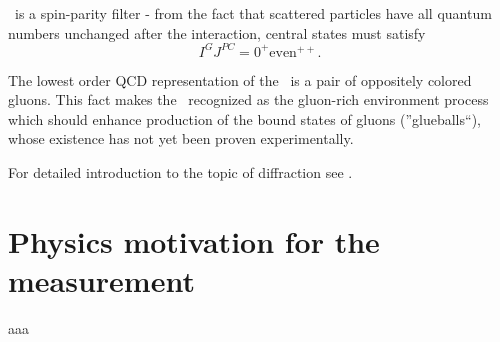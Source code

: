 \DPE\ is a spin-parity filter - from the fact that scattered particles have all quantum numbers unchanged after the interaction, central states must satisfy
\begin{equation}\label{eq:DPE_IGJPC}
 I^{G}J^{PC}=0^{+}\textrm{even}^{++}.
\end{equation}

The lowest order QCD representation of the \Pomeron\ is a pair of oppositely colored gluons. This fact makes the \DPE\ recognized as the gluon-rich environment process which should enhance production of the bound states of gluons (''glueballs``), whose existence has not yet been proven experimentally.

For detailed introduction to the topic of diffraction see \cite{pomeronAndQCD,barone}.\vspace*{-20pt}

\section{Physics motivation for the measurement}
aaa